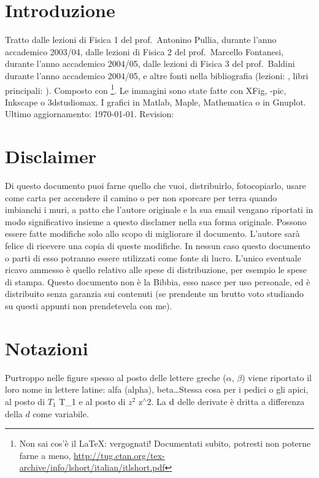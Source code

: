 \sffamily\itshape
\section*{\centering Introduzione}

Tratto dalle lezioni di Fisica 1 del %
prof.~Antonino Pullia, durante l'anno accademico 2003/04, dalle lezioni di Fisica 2 del prof.~Marcello Fontanesi, durante l'anno accademico 2004/05, dalle lezioni di Fisica 3 del prof.~Baldini durante l'anno accademico 2004/05, e altre fonti nella bibliografia (lezioni: \cite{Pullia, Fontanesi, Baldini, Paganoni, Lucchini, Franzoni, Monica, Barney, Maddalena}, libri principali: \cite{Fisica1, Feynm, modern, elettro, ottica, enge, alonso, jackson}). Composto con \LaTeXe\footnote{Non sai cos'è il \LaTeX: vergognati! Documentati subito, potresti non poterne farne a meno, \href{http://tug.ctan.org/tex-archive/info/lshort/italian/itlshort.pdf}{http://tug.ctan.org/tex-archive/info/lshort/italian/itlshort.pdf}}. Le immagini sono state fatte con XFig, \Xy-pic, Inkscape o 3dstudiomax. I grafici in Matlab, Maple, Mathematica o in Gnuplot.
\newline\newline
Ultimo aggiornamento: \today. Revision: \SVNRevision

\section*{\centering Disclaimer}
Di questo documento puoi farne quello che vuoi, distribuirlo, fotocopiarlo, usare come carta per accendere il camino o per non sporcare per terra quando imbianchi i muri, a patto che l'autore originale e la sua email vengano riportati in modo significativo insieme a questo disclamer nella sua forma originale. Possono essere fatte modifiche solo allo scopo di migliorare il do\-cu\-men\-to. L'autore sarà felice di ricevere una copia di queste modifiche. In nessun caso questo documento o parti di esso potranno essere utilizzati come  fonte di lucro. L'unico eventuale ricavo ammesso è quello relativo alle spese di distribuzione, per esempio le spese di stampa. Questo documento non è la Bibbia, esso nasce per uso personale, ed è distribuito senza garanzia sui contenuti (se prendente un brutto voto studiando su questi appunti non prendetevela con me).
\section*{\centering Notazioni}
Purtroppo nelle figure spesso al posto delle lettere greche ($\alpha$, $\beta$) viene riportato il loro nome in lettere latine: alfa (alpha), beta\ldots Stessa cosa per i pedici o gli apici, al posto di $T_1$ T\_1 e al posto di $z^2$ z$^\wedge$2. La $\mathrm{d}$ delle derivate è dritta a differenza della $d$ come variabile.
\newpage
